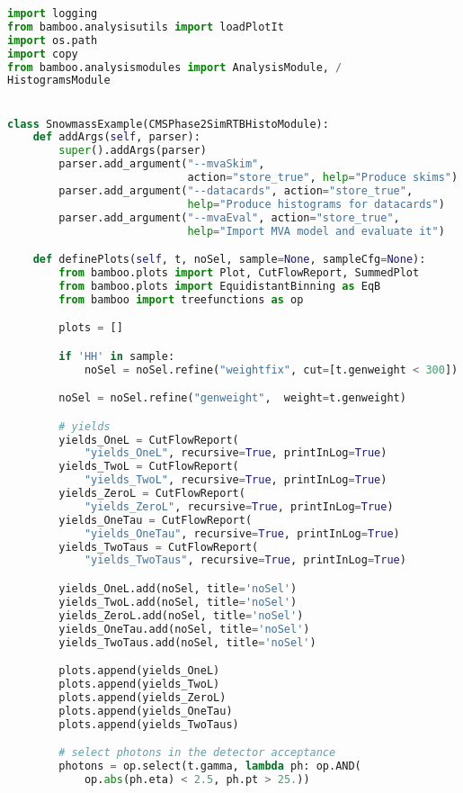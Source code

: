 \begin{lstlisting}[language=Python, caption=Python module of the analysis used in Bamboo framework, label={bamboocode}]
import logging
from bamboo.analysisutils import loadPlotIt
import os.path
import copy
from bamboo.analysismodules import AnalysisModule, /
HistogramsModule


class SnowmassExample(CMSPhase2SimRTBHistoModule):
    def addArgs(self, parser):
        super().addArgs(parser)
        parser.add_argument("--mvaSkim",
                            action="store_true", help="Produce skims")
        parser.add_argument("--datacards", action="store_true",
                            help="Produce histograms for datacards")
        parser.add_argument("--mvaEval", action="store_true",
                            help="Import MVA model and evaluate it")

    def definePlots(self, t, noSel, sample=None, sampleCfg=None):
        from bamboo.plots import Plot, CutFlowReport, SummedPlot
        from bamboo.plots import EquidistantBinning as EqB
        from bamboo import treefunctions as op

        plots = []

        if 'HH' in sample:
            noSel = noSel.refine("weightfix", cut=[t.genweight < 300])

        noSel = noSel.refine("genweight",  weight=t.genweight)

        # yields
        yields_OneL = CutFlowReport(
            "yields_OneL", recursive=True, printInLog=True)
        yields_TwoL = CutFlowReport(
            "yields_TwoL", recursive=True, printInLog=True)
        yields_ZeroL = CutFlowReport(
            "yields_ZeroL", recursive=True, printInLog=True)
        yields_OneTau = CutFlowReport(
            "yields_OneTau", recursive=True, printInLog=True)
        yields_TwoTaus = CutFlowReport(
            "yields_TwoTaus", recursive=True, printInLog=True)

        yields_OneL.add(noSel, title='noSel')
        yields_TwoL.add(noSel, title='noSel')
        yields_ZeroL.add(noSel, title='noSel')
        yields_OneTau.add(noSel, title='noSel')
        yields_TwoTaus.add(noSel, title='noSel')

        plots.append(yields_OneL)
        plots.append(yields_TwoL)
        plots.append(yields_ZeroL)
        plots.append(yields_OneTau)
        plots.append(yields_TwoTaus)

        # select photons in the detector acceptance
        photons = op.select(t.gamma, lambda ph: op.AND(
            op.abs(ph.eta) < 2.5, ph.pt > 25.))


\end{lstlisting}

